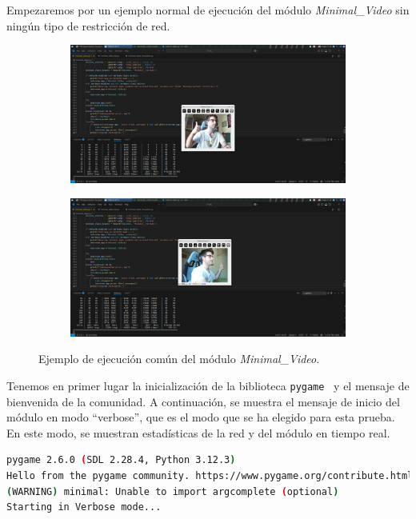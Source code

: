 Empezaremos por un ejemplo normal de ejecución del módulo \textit{Minimal\_Video} sin ningún tipo de restricción de red.
\begin{figure} [htbp]
  \centering
  \begin{subfigure}{\textwidth}
    \centering
    \includegraphics[width=\textwidth,height=0.6\textheight,keepaspectratio]{images/pruebas/ejecuion_normal1.png}
  \end{subfigure}
  \vspace{\baselineskip}
  \begin{subfigure}{\textwidth}
    \centering
    \includegraphics[width=\textwidth,height=0.6\textheight,keepaspectratio]{images/pruebas/ejecuion_normal2.png}
  \end{subfigure}
  \caption{Ejemplo de ejecución común del módulo \textit{Minimal\_Video}.}
  \label{fig:ejecucion_doble}
\end{figure}
\vspace{\baselineskip}

\newpage

Tenemos en primer lugar la inicialización de la biblioteca \texttt{pygame}~\cite{pygame} y el mensaje de bienvenida de la comunidad. A continuación, se muestra el mensaje de inicio del módulo en modo ``verbose'', que es el modo que se ha elegido para esta prueba. En este modo, se muestran estadísticas de la red y del módulo en tiempo real.
\begin{lstlisting}[language=bash,basicstyle=\ttfamily\scriptsize]
pygame 2.6.0 (SDL 2.28.4, Python 3.12.3)
Hello from the pygame community. https://www.pygame.org/contribute.html
(WARNING) minimal: Unable to import argcomplete (optional)
Starting in Verbose mode...
\end{lstlisting}

